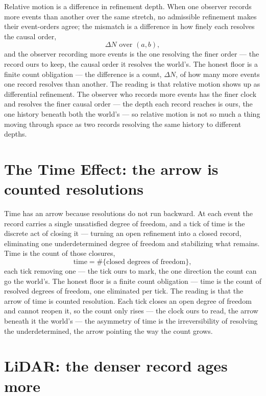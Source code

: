 Relative motion is a difference in refinement depth. When one observer records more events than another over
the same stretch, no admissible refinement makes their event-orders agree; the mismatch is a difference in how
finely each resolves the causal order,
\begin{equation}
  \Delta N \text{ over } (a, b),
\end{equation}
and the observer recording more events is the one resolving the finer order --- the record ours to keep, the
causal order it resolves the world's. The honest floor is a finite count
obligation --- the difference is a count, $\Delta N$, of how many more events one record resolves than another.
The reading is that relative motion shows up as differential refinement. The observer who records more events
has the finer clock and resolves the finer causal order --- the depth each record reaches is ours, the one
history beneath both the world's --- so relative motion is not so much a thing moving through space as two
records resolving the same history to different depths.

\section{The Time Effect: the arrow is counted resolutions}
\label{se:time}

Time has an arrow because resolutions do not run backward. At each event the record carries a single unsatisfied
degree of freedom, and a tick of time is the discrete act of closing it --- turning an open refinement into a
closed record, eliminating one underdetermined degree of freedom and stabilizing what remains. Time is the
count of those closures,
\begin{equation}
  \text{time} = \#\{\text{closed degrees of freedom}\},
\end{equation}
each tick removing one --- the tick ours to mark, the one direction the count can go the world's. The honest
floor is a finite count obligation --- time is the count of resolved degrees
of freedom, one eliminated per tick. The reading is that the arrow of time is counted resolution. Each tick
closes an open degree of freedom and cannot reopen it, so the count only rises --- the clock ours to read, the
arrow beneath it the world's --- the asymmetry of time is the irreversibility of resolving the underdetermined,
the arrow pointing the way the count grows.

\section{LiDAR: the denser record ages more}
\label{se:lidar}

